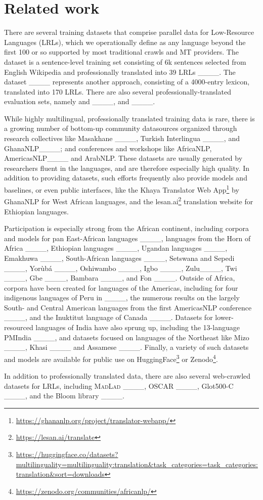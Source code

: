 \section{Related work}
There are several training datasets that comprise parallel data for Low-Resource Languages (LRLs), which we operationally define as any language beyond the first 100 or so supported by most traditional crawls and MT providers. 
The \nllbseed{} dataset is a sentence-level training set consisting of 6k sentences selected from English Wikipedia and professionally translated into 39 LRLs ____.  
The \gatitos{} dataset ____ represents another approach, consisting of a 4000-entry lexicon, translated into 170 LRLs.
There are also several professionally-translated evaluation sets, namely \floresone{} and \florestwo{} ____, and \ntrex{} ____.
 
While highly multilingual, professionally translated training data is rare, 
there is a growing number of bottom-up community datasources organized through research collectives like Masakhane ____, Turkish Interlingua ____, and GhanaNLP____;
and conferences and workshops like AfricaNLP,
AmericasNLP____ and ArabNLP.
These datasets are usually generated by researchers fluent in the languages, and are therefore especially high quality.
In addition to providing datasets, such efforts frequently also provide models and baselines, or even public interfaces, like the Khaya Translator Web App\footnote{\url{https://ghananlp.org/project/translator-webapp/}} by GhanaNLP for West African languages, and the lesan.ai\footnote{\url{https://lesan.ai/translate}} translation website for Ethiopian languages.

Participation is especially strong from the African continent, including corpora and models for pan East-African languages ____, languages from the Horn of Africa ____, Ethiopian languages ____, Ugandan languages ____, Emakhuwa ____,  South-African languages ____, Setswana and Sepedi ____, Yorùbá ____,  Oshiwambo ____, Igbo ____,
Zulu____,
Twi ____, Gbe ____, Bambara ____, and Fon ____. Outside of Africa, corpora have been created for languages of the Americas, including for four indigenous languages of Peru in ____, the numerous results on the largely South- and Central American languages from the first AmericasNLP conference ____, and the Inuktitut language of Canada ____. Datasets for lower-resourced languages of India have also sprung up, including the 13-language PMIndia ____, and datasets focused on languages of the Northeast like Mizo ____, Khasi ____ and Assamese ____. Finally, a variety of such datasets and models are available for public use on HuggingFace\footnote{\url{https://huggingface.co/datasets?multilinguality=multilinguality:translation&task_categories=task_categories:translation&sort=downloads}} or Zenodo\footnote{\url{https://zenodo.org/communities/africanlp/}}.


In addition to professionally translated data, there are also several web-crawled datasets for LRLs, including
\textsc{MadLad} ____,
OSCAR ____,
Glot500-C ____, 
and the Bloom library ____.